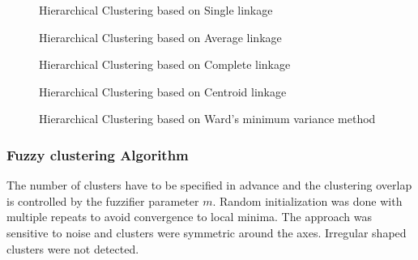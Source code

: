\begin{figure}[H]
\centering
\setlength{\lineskip}{\medskipamount}
\hfill
{}
\caption{Hierarchical Clustering based on Single linkage} \label{fig:1}
\end{figure}


\begin{figure}[H]
\centering
\setlength{\lineskip}{\medskipamount}
\hfill
{}
\caption{Hierarchical Clustering based on Average linkage} \label{fig:1}
\end{figure}


\begin{figure}[H]
\centering
\setlength{\lineskip}{\medskipamount}
\hfill
{}
\caption{Hierarchical Clustering based on Complete linkage} \label{fig:1}
\end{figure}



\begin{figure}[H]
\centering
\setlength{\lineskip}{\medskipamount}
\hfill
{}
\caption{Hierarchical Clustering based on Centroid linkage} \label{fig:1}
\end{figure}


\begin{figure}[H]
\centering
\setlength{\lineskip}{\medskipamount}
\hfill
{}
\caption{Hierarchical Clustering based on Ward’s minimum variance method} \label{fig:1}
\end{figure}



\subsubsection{Fuzzy clustering Algorithm}
The number of clusters have to be specified in advance and the clustering overlap is controlled by the fuzzifier parameter $m$. Random initialization was done with multiple repeats to avoid convergence to local minima. The approach was sensitive to noise and clusters were symmetric around the axes. Irregular shaped clusters were not detected.

